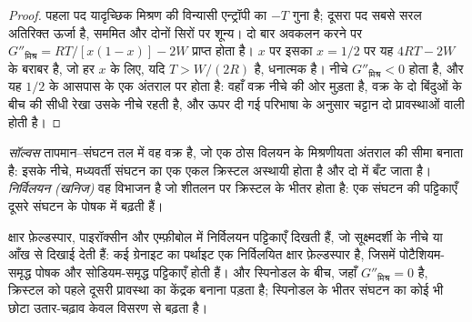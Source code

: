 \begin{proof}
पहला पद यादृच्छिक मिश्रण की विन्यासी एन्ट्रॉपी का $-T$ गुना है;
दूसरा पद सबसे सरल अतिरिक्त ऊर्जा है, सममित और दोनों सिरों पर शून्य।
दो बार अवकलन करने पर $G''_{\text{मिश्र}} = RT/[x(1 - x)] - 2W$ प्राप्त होता है। $x$ पर इसका
$x = 1/2$ पर यह $4RT - 2W$ के बराबर है, जो हर $x$ के लिए, यदि $T > W/(2R)$ है, धनात्मक है।
नीचे $G''_{\text{मिश्र}} < 0$ होता है, और यह $1/2$ के आसपास के एक अंतराल पर होता है:
वहाँ वक्र नीचे की ओर मुड़ता है, वक्र के दो बिंदुओं के बीच की सीधी रेखा
उसके नीचे रहती है, और ऊपर दी गई परिभाषा के अनुसार चट्टान दो
प्रावस्थाओं वाली होती है।
\end{proof}

\begin{definition}[सॉल्वस, निर्विलयन]\label{def:b3:petrological-thermodynamics:solvus}
\emph{सॉल्वस} तापमान--संघटन तल में वह वक्र है,
जो एक ठोस विलयन के मिश्रणीयता अंतराल की सीमा बनाता है: इसके नीचे, मध्यवर्ती संघटन का एक एकल क्रिस्टल
अस्थायी होता है और दो में बँट जाता है।
\emph{निर्विलयन (खनिज)} वह विभाजन है जो शीतलन पर
क्रिस्टल के भीतर होता है: एक संघटन की पट्टिकाएँ दूसरे संघटन के पोषक में
बढ़ती हैं।
\end{definition}

क्षार फ़ेल्डस्पार, पाइरॉक्सीन और एम्फ़ीबोल में निर्विलयन पट्टिकाएँ दिखती हैं,
जो सूक्ष्मदर्शी के नीचे या आँख से दिखाई देती हैं: कई ग्रेनाइट का पर्थाइट
एक निर्विलयित क्षार फ़ेल्डस्पार है, जिसमें पोटैशियम-समृद्ध पोषक और सोडियम-समृद्ध
पट्टिकाएँ होती हैं।  और स्पिनोडल के बीच, जहाँ $G''_{\text{मिश्र}} = 0$ है,
क्रिस्टल को पहले दूसरी प्रावस्था का केंद्रक बनाना पड़ता है; स्पिनोडल के भीतर संघटन का कोई भी छोटा
उतार-चढ़ाव केवल विसरण से बढ़ता है।

